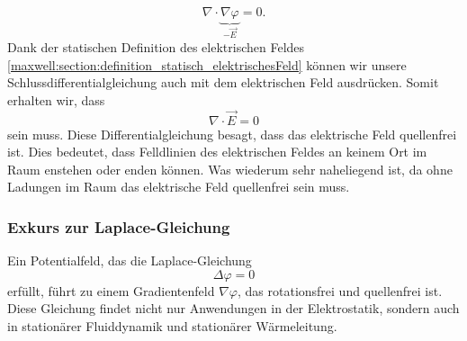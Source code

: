 \begin{equation}
\nabla\cdot\underbrace{\nabla\varphi}_{\displaystyle-\vec{E}}
=
0.
\label{maxwell:section:laplace_gleichung_3}
\end{equation}
Dank der statischen Definition des elektrischen Feldes \eqref{maxwell:section:definition_statisch_elektrischesFeld} können wir unsere Schlussdifferentialgleichung auch mit dem elektrischen Feld ausdrücken. Somit erhalten wir, dass
\begin{equation}
	\nabla\cdot\vec{E}
	=
	0
	\label{maxwell:section:e_feld_quellenfrei}
\end{equation}
sein muss. Diese Differentialgleichung besagt, dass das elektrische Feld quellenfrei ist.
Dies bedeutet, dass Felldlinien des elektrischen Feldes an keinem Ort im Raum enstehen oder enden können.
Was wiederum sehr naheliegend ist, da ohne Ladungen im Raum das elektrische Feld quellenfrei sein muss.

\subsubsection{Exkurs zur Laplace-Gleichung}
\label{maxwell:section:laplacegleichung_exkurs}
Ein Potentialfeld, das die Laplace-Gleichung
\[
\Delta\varphi
=
0
\]
erfüllt, führt zu einem Gradientenfeld $\nabla\varphi$, das rotationsfrei und quellenfrei ist.
Diese Gleichung findet nicht nur Anwendungen in der Elektrostatik, sondern auch in stationärer Fluiddynamik und stationärer Wärmeleitung.






